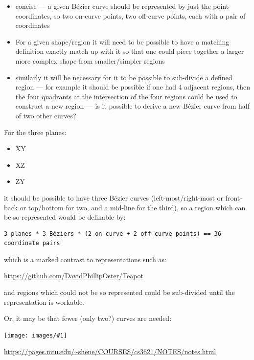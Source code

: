 \documentclass{ltxdoc}
\newcommand{\includeimage}[1]{\bigskip\noindent\texttt{[image: images/\#1]}\bigskip}
\begin{document}
\begin{itemize}
\item concise --- a given Bézier curve should be represented by just the point coordinates, 
      so two on-curve points, two off-curve points, each with a pair of coordinates
\item For a given shape/region it will need to be possible to have a matching definition 
      exactly match up with it so that one could piece together a larger more complex shape 
      from smaller/simpler regions
\item similarly it will be necessary for it to be possible to sub-divide a defined region --- 
      for example it should be possible if one had 4 adjacent regions, then the four quadrants 
      at the intersection of the four regions could be used to construct a new region --- is it
      possible to derive a new Bézier curve from half of two other curves?
\end{itemize}

\begin{samepage}
For the three planes:

\begin{itemize}
 \item XY
 \item XZ
 \item ZY
\end{itemize}
 
\noindent it should be possible to have three Bézier curves (left-most/right-most or front-back or top/bottom for two, and a mid-line for the third), so a region which can be so represented would be definable by:
 
\begin{verbatim}
3 planes * 3 Béziers * (2 on-curve + 2 off-curve points) == 36 coordinate pairs
\end{verbatim}
\end{samepage}
 
\noindent which is a marked contrast to representations such as:
 
\url{https://github.com/DavidPhillipOster/Teapot}

\noindent and regions which could not be so represented could be sub-divided until the representation is workable.

Or, it may be that fewer (only two?) curves are needed:

\includeimage{Screenshot 2024-08-11 at 6.55.26 PM.png}

\url{https://pages.mtu.edu/~shene/COURSES/cs3621/NOTES/notes.html}
\end{document}
